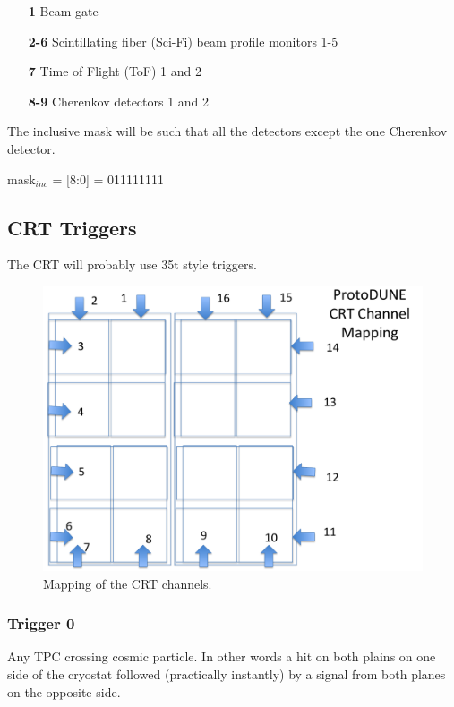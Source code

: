 \documentclass[]{report}
\begin{document}
\begin{itemize}
	\item[\textbf{1}] Beam gate
	\item[\textbf{2-6}] Scintillating fiber (Sci-Fi) beam profile monitors 1-5
	\item[\textbf{7}] Time of Flight (ToF) 1 and 2 
	\item[\textbf{8-9}] Cherenkov detectors 1 and 2
\end{itemize}

The inclusive mask will be such that all the detectors except the one Cherenkov detector.

\begin{center}
	mask$_{inc}$ = [8:0] = 011111111
\end{center}

\subsection{CRT Triggers}

The CRT will probably use 35t style triggers.

	 \begin{figure}[H]
	 	\centering
	 	\includegraphics[width=5.25in]{crt_mapping.pdf}
	 	\caption{Mapping of the CRT channels.}
	 	\label{fig:crt_ch_map}
	 \end{figure}

\subsubsection{Trigger 0}

Any TPC crossing cosmic particle. In other words a hit on both plains on one side of the cryostat followed (practically instantly) by a signal from both planes on the opposite side.
\end{document}
